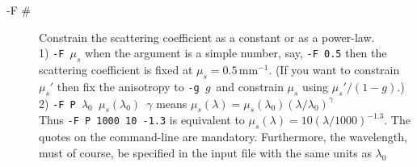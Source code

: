 \documentclass{article}
\begin{document}
\begin{description}
    \item[-F \#] Constrain the scattering coefficient as a constant or as a power-law.\\[1mm]
                 1) \texttt{-F $\mu_s$} when the argument is a simple number, say,
                 \texttt{-F 0.5} then the scattering coefficient is fixed at $\mu_s=0.5\,$mm$^{-1}$.
                 (If you want to constrain $\mu_s'$ then fix the anisotropy to \texttt{-g $g$}\
                 and constrain $\mu_s$ using $\mu_s'/(1-g)$.)\\[1mm]  
                 2) \texttt{-F \textquotesingle{}P $\lambda_0$ $\mu_s(\lambda_0)$ $\gamma$\textquotesingle}  means 
                 $\mu_s(\lambda)=\mu_s(\lambda_0) \left(\lambda/\lambda_0\right)^\gamma$\\
                 Thus \texttt{-F \textquotesingle{}P 1000 10 -1.3\textquotesingle}
                 is equivalent to $\mu_s(\lambda) = 10 (\lambda/1000)^{-1.3}$. The quotes on the command-line
                 are mandatory.  Furthermore, the wavelength, must of course,
                 be specified in the input file with the same units as $\lambda_0$


\end{description}
\end{document}
